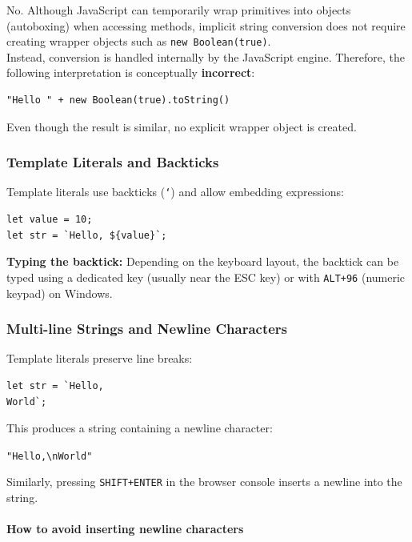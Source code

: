 \documentclass{scrbook}
\begin{document}
No. Although JavaScript can temporarily wrap primitives into objects (autoboxing) when accessing methods, implicit string conversion does not require creating wrapper objects such as \texttt{new Boolean(true)}.\\

Instead, conversion is handled internally by the JavaScript engine. Therefore, the following interpretation is conceptually \textbf{incorrect}:

\begin{lstlisting}
"Hello " + new Boolean(true).toString()
\end{lstlisting}

Even though the result is similar, no explicit wrapper object is created.

\subsubsection{Template Literals and Backticks}

Template literals use backticks (\texttt{`}) and allow embedding expressions:

\begin{lstlisting}
let value = 10;
let str = `Hello, ${value}`;
\end{lstlisting}

\textbf{Typing the backtick:}  
Depending on the keyboard layout, the backtick can be typed using a dedicated key (usually near the ESC key) or with \texttt{ALT+96} (numeric keypad) on Windows.

\subsubsection{Multi-line Strings and Newline Characters}

Template literals preserve line breaks:

\begin{lstlisting}
let str = `Hello,
World`;
\end{lstlisting}

This produces a string containing a newline character:

\begin{center}
\texttt{"Hello,\textbackslash nWorld"}
\end{center}

Similarly, pressing \texttt{SHIFT+ENTER} in the browser console inserts a newline into the string.

\paragraph{How to avoid inserting newline characters}
\end{document}
